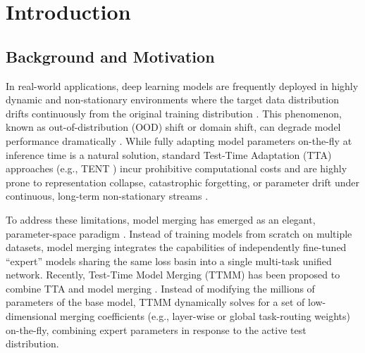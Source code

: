 \documentclass{article}
\theoremstyle{plain}
\theoremstyle{definition}
\theoremstyle{remark}
\begin{document}
\section{Introduction}
\label{intro}

\subsection{Background and Motivation}
In real-world applications, deep learning models are frequently deployed in highly dynamic and non-stationary environments where the target data distribution drifts continuously from the original training distribution \cite{wang2021tent, liang2020shot, song2023ecotta, du2024multisource, lin2024fully, ruan2024fully}. This phenomenon, known as out-of-distribution (OOD) shift or domain shift, can degrade model performance dramatically \cite{dbler2022robust, zhou2024fully}. While fully adapting model parameters on-the-fly at inference time is a natural solution, standard Test-Time Adaptation (TTA) approaches (e.g., TENT \cite{wang2021tent}) incur prohibitive computational costs and are highly prone to representation collapse, catastrophic forgetting, or parameter drift under continuous, long-term non-stationary streams \cite{wang2022continual, zhao2023delta, niu2023towards}.

To address these limitations, model merging has emerged as an elegant, parameter-space paradigm \cite{yadav2023ties, ilharco2022editing}. Instead of training models from scratch on multiple datasets, model merging integrates the capabilities of independently fine-tuned ``expert'' models sharing the same loss basin into a single multi-task unified network. Recently, Test-Time Model Merging (TTMM) has been proposed to combine TTA and model merging \cite{yang2024adamerging, anonymous2026s2c}. Instead of modifying the millions of parameters of the base model, TTMM dynamically solves for a set of low-dimensional merging coefficients (e.g., layer-wise or global task-routing weights) on-the-fly, combining expert parameters in response to the active test distribution.
\end{document}
